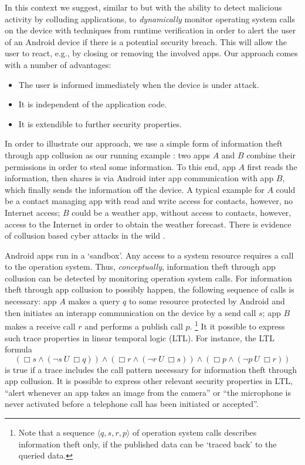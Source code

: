 \documentclass[runningheads]{llncs}
\begin{document}
In this context we suggest, similar to \cite{bauer2012runtime}
but with the ability to detect malicious activity by colluding
applications, to \emph{dynamically} monitor operating system
calls on the device with techniques from runtime verification in
order to alert the user of an Android device if there is a potential
security breach. This will allow the user to react, e.g., by closing
or removing the involved apps.
Our approach comes with a number of advantages:
\begin{itemize}
\item The user is informed immediately when the device is under
  attack.
\item It is independent of the application code.  %
\item It is extendible to further security properties.
\end{itemize}

In order to illustrate our approach, we use a simple form of
information theft through app collusion as our running example
\cite{collusion17}: two apps $A$ and $B$ combine their permissions in
order to steal some information. To this end, app $A$ first reads the
information, then shares is via Android inter app communication with
app $B$, which finally sends the information off the device. A typical
example for $A$ could be a contact managing app with read and write
access for contacts, however, no Internet access; $B$ could be a
weather app, without access to contacts, however, access to the
Internet in order to obtain the weather forecast. There is evidence of
collusion based cyber attacks in the wild
\cite{PrologAppCollusion}. 

Android apps run in a `sandbox'. Any access to a system resource
requires a call to the operation system. Thus, \emph{conceptually},
information theft through app collusion can be detected by monitoring
operation system calls. For information theft through app collusion to
possibly happen, the following sequence of calls is necessary: app $A$
makes a query $q$ to some resource protected by Android and then
initiates an interapp communication on the device by a send call $s$;
app $B$ makes a receive call $r$ and performs a publish call
$p$. \footnote{Note that a sequence $\langle q, s, r, p \rangle$ of
  operation system calls describes information theft only, if the
  published data can be `traced back' to the queried data.} It it
possible to express such trace properties in linear temporal logic
(LTL). For instance, the LTL formula
%
$$       (\Box s \land (\neg s\ U\ \Box q))
   \land (\Box r \land (\neg r\ U\ \Box s)) 
   \land (\Box p \land (\neg p\ U\ \Box r)) 
$$ 
%
is true if a trace includes the call pattern necessary for information
theft through app collusion.
%
It is possible to express other relevant security properties in LTL,
``alert whenever an app takes an image from the camera'' or ``the
microphone is never activated before a telephone call has been
initiated or accepted''.
\end{document}
